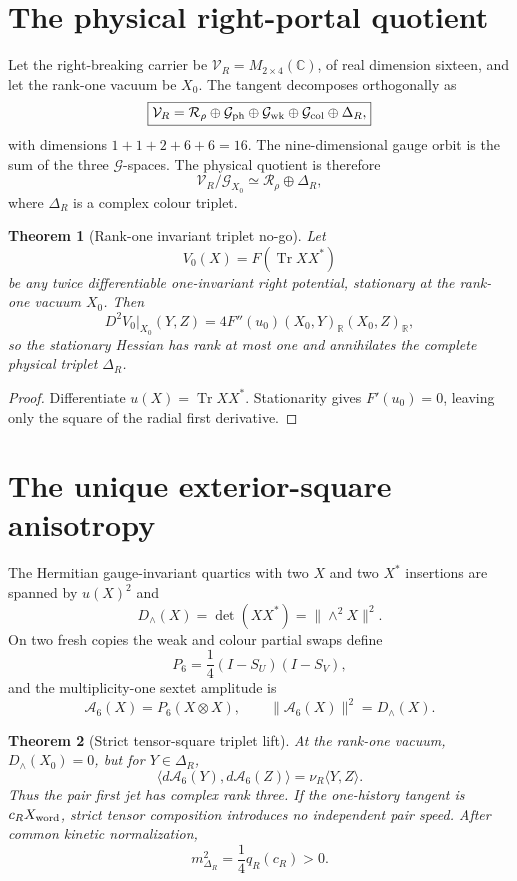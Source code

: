 \documentclass[11pt,oneside,openany]{book}
\numberwithin{equation}{chapter}
\newtheorem{theorem}{Theorem}[chapter]
\theoremstyle{definition}
\theoremstyle{remark}
\newcommand{\C}{\mathbb C}
\newcommand{\R}{\mathbb R}
\newcommand{\Tr}{\operatorname{Tr}}
\begin{document}
\section{The physical right-portal quotient}
Let the right-breaking carrier be
\(\mathcal V_R=M_{2\times4}(\C)\), of real dimension sixteen, and let the
rank-one vacuum be \(X_0\).  The tangent decomposes orthogonally as
\[
 \boxed{
 \mathcal V_R
 =\mathcal R_\rho\oplus\mathcal G_{\rm ph}
 \oplus\mathcal G_{\rm wk}\oplus\mathcal G_{\rm col}
 \oplus\Delta_R,}
\]
with dimensions \(1+1+2+6+6=16\).  The nine-dimensional gauge orbit is the
sum of the three \(\mathcal G\)-spaces.  The physical quotient is therefore
\[
 \boxed{\mathcal V_R/\mathcal G_{X_0}\simeq\mathcal R_\rho\oplus\Delta_R,}
\]
where \(\Delta_R\) is a complex colour triplet.

\begin{theorem}[Rank-one invariant triplet no-go]
\label{thm:v5-triplet-nogo}
Let
\[
 V_0(X)=F\!\left(\Tr XX^*\right)
\]
be any twice differentiable one-invariant right potential, stationary at the
rank-one vacuum \(X_0\).  Then
\[
 D^2V_0|_{X_0}(Y,Z)
 =4F''(u_0)(X_0,Y)_\R(X_0,Z)_\R,
\]
so the stationary Hessian has rank at most one and annihilates the complete
physical triplet \(\Delta_R\).
\end{theorem}

\begin{proof}
Differentiate \(u(X)=\Tr XX^*\).  Stationarity gives \(F'(u_0)=0\), leaving
only the square of the radial first derivative.
\end{proof}

\section{The unique exterior-square anisotropy}
The Hermitian gauge-invariant quartics with two \(X\) and two \(X^*\)
insertions are spanned by \(u(X)^2\) and
\[
 \boxed{
 D_\wedge(X)=\det(XX^*)=\|\wedge^2X\|^2.}
\]
On two fresh copies the weak and colour partial swaps define
\[
 P_6=\frac14(I-S_U)(I-S_V),
\]
and the multiplicity-one sextet amplitude is
\[
 \mathcal A_6(X)=P_6(X\otimes X),
 \qquad
 \|\mathcal A_6(X)\|^2=D_\wedge(X).
\]

\begin{theorem}[Strict tensor-square triplet lift]
\label{thm:v5-pair-triplet}
At the rank-one vacuum, \(D_\wedge(X_0)=0\), but for
\(Y\in\Delta_R\),
\[
 \boxed{
 \langle d\mathcal A_6(Y),d\mathcal A_6(Z)\rangle
 =\nu_R\langle Y,Z\rangle.}
\]
Thus the pair first jet has complex rank three.  If the one-history tangent is
\(c_RX_{\rm word}\), strict tensor composition introduces no independent
pair speed.  After common kinetic normalization,
\[
 \boxed{m_{\Delta_R}^2=\frac14q_R(c_R)>0.}
\]
\end{theorem}
\end{document}
